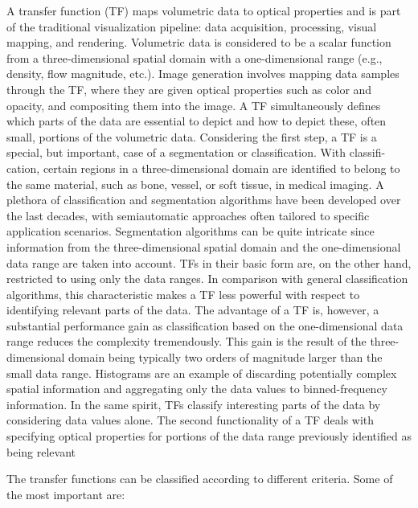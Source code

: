 A transfer function (TF) maps volumetric data to optical properties
and is part of the traditional visualization pipeline: data acquisition,
processing, visual mapping, and rendering. Volumetric data is
considered to be a scalar function from a three-dimensional spatial
domain with a one-dimensional range (e.g., density, flow magnitude,
etc.). Image generation involves mapping data samples through the
TF, where they are given optical properties such as color and opacity,
and compositing them into the image.
A TF simultaneously defines which parts of the data are essential
to depict and  how to depict these, often small, portions
of the volumetric data. Considering the first step, a TF is a special,
but important, case of a segmentation or classification. With classifi-
cation, certain regions in a three-dimensional domain are identified
to belong to the same material, such as bone, vessel, or soft tissue,
in medical imaging. A plethora of classification and segmentation
algorithms have been developed over the last decades, with semiautomatic
approaches often tailored to specific application scenarios.
Segmentation algorithms can be quite intricate since information
from the three-dimensional spatial domain and the one-dimensional
data range are taken into account. TFs in their basic form are, on the
other hand, restricted to using only the data ranges. In comparison
with general classification algorithms, this characteristic makes a
TF less powerful with respect to identifying relevant parts of the
data. The advantage of a TF is, however, a substantial performance
gain as classification based on the one-dimensional data range reduces
the complexity tremendously. This gain is the result of the
three-dimensional domain being typically two orders of magnitude
larger than the small data range. Histograms are an example of discarding
potentially complex spatial information and aggregating
only the data values to binned-frequency information. In the same
spirit, TFs classify interesting parts of the data by considering data
values alone. The second functionality of a TF deals with specifying
optical properties for portions of the data range previously identified
as being relevant

The transfer functions can be classified according to different criteria. Some of the most important are:

